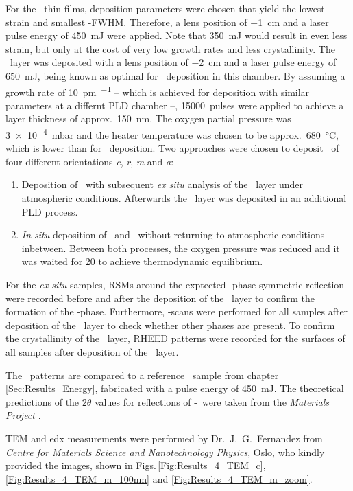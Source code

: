 For the \cro\ thin films, deposition parameters were chosen that yield the lowest strain and smallest \textomega-FWHM.
Therefore, a lens position of \qty{-1}{\cm} and a laser pulse energy of \qty{450}{\milli\joule} were applied.
Note that \qty{350}{\milli\joule} would result in even less strain, but only at the cost of very low growth rates and less crystallinity.
The \gao\ layer was deposited with a lens position of \qty{-2}{\cm} and a laser pulse energy of \qty{650}{\milli\joule}, being known as optimal for \agao\ deposition in this chamber.
By assuming a growth rate of \qty{10}{\pm\per\pulse} -- which is achieved for deposition with similar parameters at a differnt PLD chamber --, \qty{15000}{pulses} were applied to achieve a layer thickness of approx.\ \qty{150}{\nm}.
The oxygen partial pressure was \qty{3e-4}{\milli\bar} and the heater temperature was chosen to be approx.\ \qty{680}{\degreeCelsius}, which is lower than for \cro\ deposition.
Two approaches were chosen to deposit \agao\ of four different orientations \textit{c}, \textit{r}, \textit{m} and \textit{a}:
\begin{enumerate}
    \item Deposition of \cro\ with subsequent \textit{ex situ} analysis of the \cro\ layer under atmospheric conditions.
    Afterwards the \gao\ layer was deposited in an additional PLD process.
    \item \textit{In situ} deposition of \cro\ and \gao\ without returning to atmospheric conditions inbetween.
    Between both processes, the oxygen pressure was reduced and it was waited for \qty{20}{\min} to achieve thermodynamic equilibrium.
\end{enumerate}

For the \textit{ex situ} samples, \glspl{RSM} around the exptected \textalpha-phase symmetric reflection were recorded before and after the deposition of the \gao\ layer to confirm the formation of the \textalpha-phase.
Furthermore, \thetaomega-scans were performed for all samples after deposition of the \gao\ layer to check whether other phases are present.
To confirm the crystallinity of the \gao\ layer, \gls{RHEED} patterns were recorded for the surfaces of all samples after deposition of the \gao\ layer.
    

The \thetaomega\ patterns are compared to a reference \cro\ sample from chapter \ref{Sec:Results_Energy}, fabricated with a pulse energy of \qty{450}{\milli\joule}.
The theoretical predictions of the $2\theta$ values for reflections of \textbeta-\gao\ were taken from the \textit{Materials Project}
    \cite[mp-886]{MaterialsProject}.

\gls{TEM} and \gls{edx} measurements were performed by Dr.\ J.\ G.\  Fernandez from \textit{Centre for Materials Science and Nanotechnology Physics}, Oslo, who kindly provided the images, shown in Figs.\,\ref{Fig:Results_4_TEM_c}, \ref{Fig:Results_4_TEM_m_100nm} and \ref{Fig:Results_4_TEM_m_zoom}.